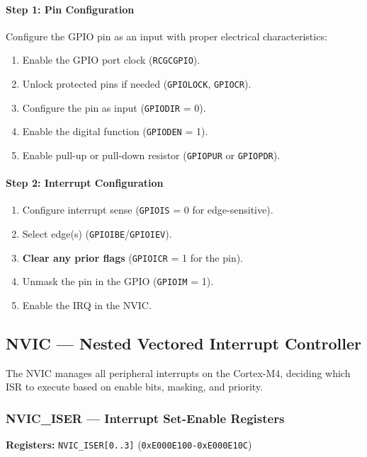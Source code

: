 \paragraph{Step 1: Pin Configuration}
Configure the GPIO pin as an input with proper electrical characteristics:
\begin{enumerate}[nosep]
  \item Enable the GPIO port clock (\texttt{RCGCGPIO}).
  \item Unlock protected pins if needed (\texttt{GPIOLOCK}, \texttt{GPIOCR}).
  \item Configure the pin as input (\texttt{GPIODIR} = 0).
  \item Enable the digital function (\texttt{GPIODEN} = 1).
  \item Enable pull-up or pull-down resistor (\texttt{GPIOPUR} or \texttt{GPIOPDR}).
\end{enumerate}

\paragraph{Step 2: Interrupt Configuration}
\begin{enumerate}[nosep]
  \item Configure interrupt sense (\texttt{GPIOIS} = 0 for edge-sensitive).
  \item Select edge(s) (\texttt{GPIOIBE}/\texttt{GPIOIEV}).
  \item \textbf{Clear any prior flags} (\texttt{GPIOICR} = 1 for the pin).
  \item Unmask the pin in the GPIO (\texttt{GPIOIM} = 1).
  \item Enable the IRQ in the NVIC.
\end{enumerate}


\subsection{NVIC — Nested Vectored Interrupt Controller}

The NVIC manages all peripheral interrupts on the Cortex-M4, deciding which ISR to execute based on enable bits, masking, and priority.

\subsubsection*{NVIC\_ISER — Interrupt Set-Enable Registers}

\noindent\textbf{Registers:} \texttt{NVIC\_ISER[0..3]} (\texttt{0xE000E100-0xE000E10C})


